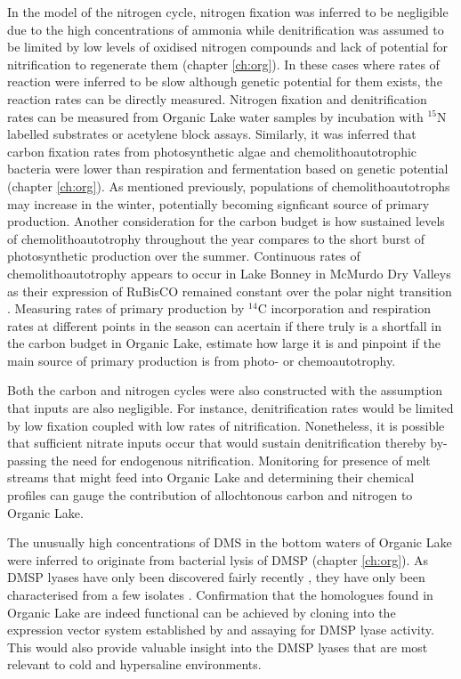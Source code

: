 In the model of the nitrogen cycle, nitrogen fixation was inferred to be negligible due to the high concentrations of ammonia while denitrification was assumed to be limited by low levels of oxidised nitrogen compounds and lack of potential for nitrification to regenerate them (chapter \ref{ch:org}).
In these cases where rates of reaction were inferred to be slow although genetic potential for them exists, the reaction rates can be directly measured.
Nitrogen fixation and denitrification rates can be measured from Organic Lake water samples by incubation with $^{15}$N labelled substrates or acetylene block assays.
Similarly, it was inferred that carbon fixation rates from photosynthetic algae and chemolithoautotrophic bacteria were lower than respiration and fermentation based on genetic potential (chapter \ref{ch:org}).
As mentioned previously, populations of chemolithoautotrophs may increase in the winter, potentially becoming signficant source of primary production.
Another consideration for the carbon budget is how sustained levels of chemolithoautotrophy throughout the year compares to the short burst of photosynthetic production over the summer.
Continuous rates of chemolithoautotrophy appears to occur in Lake Bonney in McMurdo Dry Valleys as their expression of \acs{RuBisCO} remained constant over the polar night transition \cite{Kong2012b}.
Measuring rates of primary production by $^{14}$C incorporation and respiration rates at different points in the season can acertain if there truly is a shortfall in the carbon budget in Organic Lake, estimate how large it is and pinpoint if the main source of primary production is from photo- or chemoautotrophy.

Both the carbon and nitrogen cycles were also constructed with the assumption that inputs are also negligible.
For instance, denitrification rates would be limited by low fixation coupled with low rates of nitrification.
Nonetheless, it is possible that sufficient nitrate inputs occur that would sustain denitrification thereby by-passing the need for endogenous nitrification.
Monitoring for presence of melt streams that might feed into Organic Lake and determining their chemical profiles can gauge the contribution of allochtonous carbon and nitrogen to Organic Lake.

The unusually high concentrations of \ac{DMS} in the bottom waters of Organic Lake were inferred to originate from bacterial lysis of \ac{DMSP} (chapter \ref{ch:org}).
As \ac{DMSP} lyases have only been discovered fairly recently \cite{Todd2007, Curson2008}, they have only been characterised from a few isolates \cite{Todd2007, Curson2008, Curson2010, Todd2010, Curson2012}.
Confirmation that the homologues found in Organic Lake are indeed functional can be achieved by cloning into the expression vector system established by \citet{Todd2007} and assaying for \ac{DMSP} lyase activity.
This would also provide valuable insight into the \ac{DMSP} lyases that are most relevant to cold and hypersaline environments.

